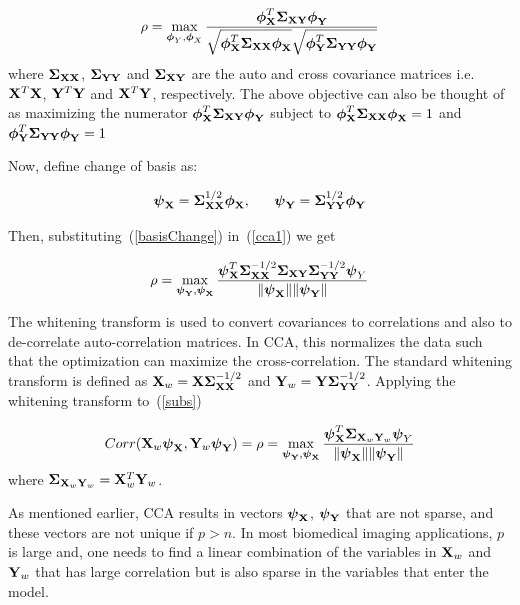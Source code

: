 \documentclass{llncs}
\newcommand{\X}{{\bf X}}
\newcommand{\Y}{{\bf Y}}
\newcommand{\bs}{\boldsymbol}
\begin{document}
\begin{equation}
\label{cca1}
\rho=\max_{{\bs\phi_Y}, {\bs\phi_X}}
\frac{{\bs\phi_{\X}^T\bs\Sigma_{\X\Y}}\bs\phi_{\Y}}{\sqrt{\bs\phi_{\X}^T\bs\Sigma_{\X\X}\bs\phi_{\X}}\sqrt{\bs\phi_{\Y}^T\bs\Sigma_{\Y\Y}\bs\phi_{\Y}}}
\end{equation}
where ${\bs\Sigma_{\X\X}}$, ${\bs\Sigma_{\Y\Y}}$ and ${\bs\Sigma_{\X\Y}}$ are the auto and cross covariance matrices i.e. $\X^T\X$, $\Y^T\Y$ and $\X^T\Y$, respectively. The above objective can also be thought of as maximizing the numerator $\bs\phi_{\X}^T\bs\Sigma_{\X\Y}\bs\phi_{\Y}$ subject to $\bs\phi_{\X}^T\bs\Sigma_{\X\X}\bs\phi_{\X} =1$ and $\bs\phi_{\Y}^T\bs\Sigma_{\Y\Y}\bs\phi_{\Y}=1$

Now, define change of basis as:

\begin{equation}
\label{basisChange}
\bs\psi_{\X} = \bs\Sigma_{\X\X}^{1/2}\bs\phi_{\X}, \;\;\;\;\;\;   \bs\psi_{\Y} = \bs\Sigma_{\Y\Y}^{1/2}\bs\phi_{\Y} 
\end{equation}

Then, substituting~(\ref{basisChange}) in~(\ref{cca1}) we get 

\begin{equation}
\label{subs}
\rho= \max_{{\bs\psi_{\Y}}, {\bs\psi_{\X}}} \frac{\bs\psi_{\X}^T \bs\Sigma_{\X\X}^{-1/2}\bs\Sigma_{\X\Y}\bs\Sigma_{\Y\Y}^{-1/2}\bs\psi_Y}{\|\bs\psi_{\X}\| \|\bs\psi_{\Y}\|}
\end{equation}

The whitening transform is used to convert covariances to correlations
and also to de-correlate auto-correlation matrices.  In CCA, this
normalizes the data such that the optimization can maximize the
cross-correlation.  The standard whitening transform is defined as
$\X_w= \X\bs\Sigma_{\X\X}^{-1/2}$ and $\Y_w=
\Y\bs\Sigma_{\Y\Y}^{-1/2}$.  Applying the whitening transform
to~(\ref{subs})

\begin{equation}
\label{simplifiedcca}
Corr(\X_w\bs\psi_{\X},\Y_w\bs\psi_{\Y})=\rho=\max_{{\bs\psi_{\Y}}, {\bs\psi_{\X}}} \frac{\bs\psi_{\X}^T \bs\Sigma_{\X_w\Y_w}\bs\psi_Y}{\|\bs\psi_{\X}\| \|\bs\psi_{\Y}\|}
\end{equation}
where $\bs\Sigma_{\X_w\Y_w} = \X_w^T\Y_w$. 

As mentioned earlier, CCA results in vectors $\bs\psi_{\X}$,
$\bs\psi_{\Y}$ that are not sparse, and these vectors are not unique
if $p > n$. In most biomedical imaging applications, $p$ is
large and, one needs to find a linear combination of the
variables in $\X_w$ and $\Y_w$ that has large correlation but is also
sparse in the variables that enter the model.  
\end{document}
